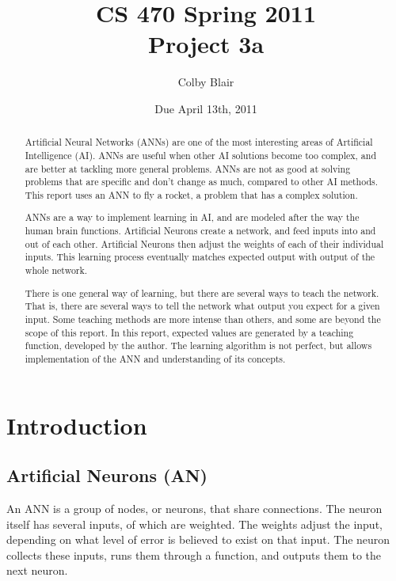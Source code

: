\documentclass[12pt]{article}
\title{CS 470 Spring 2011 \\
     Project 3a}
\author{Colby Blair}
\date{Due April 13th, 2011}
\begin{document}
\maketitle

\begin{abstract}
Artificial Neural Networks (ANNs) are one of the most interesting areas of Artificial Intelligence (AI). ANNs 
are useful when other AI solutions become too complex, and are better at tackling more general problems.
ANNs are not as good at solving problems that are specific and don't change as much, compared to other
AI methods. This report uses an ANN to fly a rocket, a problem that has a complex solution.

ANNs are a way to implement learning in AI, and are modeled after the way the human brain functions. Artificial Neurons create a network, and feed inputs into and out of each other. Artificial Neurons then adjust the weights of each of their individual inputs. This learning process eventually matches expected output with
output of the whole network. 

There is one general way of learning, but there are several ways to teach the network. That is, there are 
several ways to tell the network what output you expect for a given input. Some teaching methods are
more intense than others, and some are beyond the scope of this report. In this report, expected values
are generated by a teaching function, developed by the author. The learning algorithm is not perfect, but 
allows implementation of the ANN and understanding of its concepts.
\end{abstract}

\thispagestyle{empty}

\pagebreak

\thispagestyle{empty}
\tableofcontents
\listoffigures

\pagebreak

\setcounter{page}{1}

\section{Introduction}

\subsection{Artificial Neurons (AN)}
An  ANN is a group of nodes, or neurons, that share connections. The neuron itself has several inputs,
of which are weighted. The weights adjust the input, depending on what level of error is believed to exist
on that input. The neuron collects these inputs, runs them through a function, and outputs them to the
next neuron.
\end{document}

